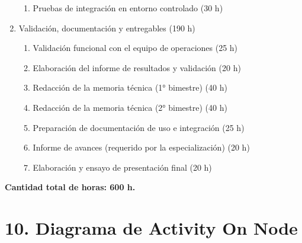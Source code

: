 \documentclass[
11pt, %
]{charter}
\begin{document}
\begin{enumerate}
\begin{enumerate}
  \item Pruebas de integración en entorno controlado (30 h)
\end{enumerate}
\item Validación, documentación y entregables (190 h)
\begin{enumerate}
  \item Validación funcional con el equipo de operaciones (25 h)
  \item Elaboración del informe de resultados y validación (20 h)
  \item Redacción de la memoria técnica (1° bimestre) (40 h)
  \item Redacción de la memoria técnica (2° bimestre) (40 h)
  \item Preparación de documentación de uso e integración (25 h)
  \item Informe de avances (requerido por la especialización) (20 h)
  \item Elaboración y ensayo de presentación final (20 h)
\end{enumerate}
\end{enumerate}

\textbf{Cantidad total de horas: 600 h.}


\section{10. Diagrama de Activity On Node}
\label{sec:AoN}
\end{document}
